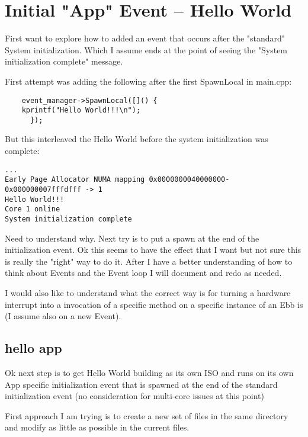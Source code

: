 \documentclass[11pt]{report}
\begin{document}
\section{Initial "App" Event -- Hello World}

First want to explore how to added an event that occurs after
the "standard" System initialization.  Which I assume ends
at the point of seeing the "System initialization complete" message.

First attempt was adding the following after the first SpawnLocal in main.cpp:
\begin{verbatim}
    event_manager->SpawnLocal([]() {
	kprintf("Hello World!!!\n");
      });
\end{verbatim}

But this interleaved the Hello World before the system initialization was complete:
\begin{verbatim}
...
Early Page Allocator NUMA mapping 0x0000000040000000-0x000000007fffdfff -> 1
Hello World!!!
Core 1 online
System initialization complete
\end{verbatim}

Need to understand why.
Next try is to put a spawn at the end of the initialization event.
Ok this seems to have the effect that I want but not sure this is really 
the "right" way to do it.  After I have a better understanding of how to 
think about Events and the Event loop I will document and redo as needed.

I would also like to understand what the correct way is for turning a hardware
interrupt into a invocation of a specific method on a specific instance of an Ebb is (I assume also on a new Event).

\subsection{hello app}
Ok next step is to get Hello World building as its own ISO and runs
on its own App specific initialization event that is spawned at the 
end of the standard initialization event (no consideration for 
multi-core issues at this point)

First approach I am trying is to create a new set of files in the same
directory and modify as little as possible in the current files.
\end{document}
